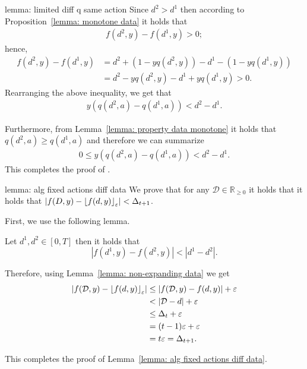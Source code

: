 \begin{proofof}{lemma: limited diff q same action}
Since $d^2 > d^1$ then according to Proposition~\ref{lemma: monotone data} it holds that
\begin{align*}
f(d^2, y) - f(d^1, y) > 0;
\end{align*}
hence,
\begin{align*}
f(d^2, y) - f(d^1, y) &= d^2 + (1-yq(d^2, y)) - d^1 - (1-yq(d^1, y)) \\
&= d^2 - yq(d^2, y) - d^1 + yq(d^1, y) > 0.
\end{align*}
Rearranging the above inequality, we get that
\begin{align*}
y(q(d^2, a) - q(d^1, a)) < d^2 - d^1.
\end{align*}

Furthermore, from Lemma~\ref{lemma: property data monotone} it holds that $q(d^2, a) \geq q(d^1, a)$ and therefore we can summarize
\begin{align*}
0 \leq y(q(d^2, a) - q(d^1, a)) < d^2 - d^1.
\end{align*}
This completes the proof of .
\end{proofof}






\begin{proofof}{lemma: alg fixed actions diff data}
We prove that for any $\mathcal{D} \in \mathbb{R}_{\geq 0}$ it holds that
it holds that $\left| f(D, y) - {\left\lfloor f(d, y)\right\rfloor_{\varepsilon}} \right| < \Delta_{t+1}$.

First, we use the following lemma.
\begin{lemma}\label{lemma: non-expanding data}
Let $d^1, d^2 \in [0, T]$ then it holds that
\[
\left| f(d^1, y) - f(d^2, y) \right| < \left| d^1 - d^2 \right|.
\]
\end{lemma}

Therefore, using Lemma~\ref{lemma: non-expanding data} we get
\begin{align*}
\left| f(\mathcal{D}, y) - {\left\lfloor f(d, y)\right\rfloor_{\varepsilon}} \right| &\leq \left| f(\mathcal{D}, y) - f(d, y) \right| + \varepsilon \\
&< \left| \mathcal{D} - d \right| + \varepsilon \\
&\leq \Delta_t + \varepsilon \\
&= (t-1)\varepsilon + \varepsilon \\
&= t\varepsilon = \Delta_{t+1}.
\end{align*}

This completes the proof of Lemma~\ref{lemma: alg fixed actions diff data}.
\end{proofof}


